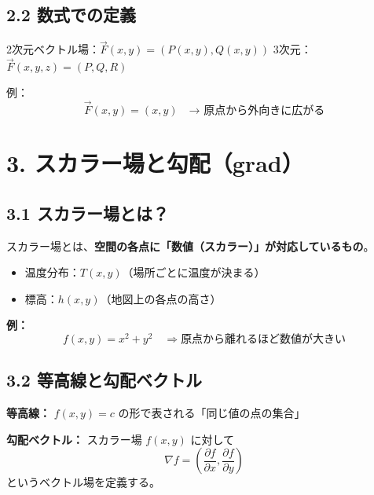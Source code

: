 \documentclass[a4j,11pt]{jsarticle}
\begin{document}
\begin{center}
\end{center}

\subsection*{2.2 数式での定義}
2次元ベクトル場：$\vec{F}(x, y) = (P(x, y), Q(x, y))$  
3次元：$\vec{F}(x, y, z) = (P, Q, R)$

\vspace{3mm}
例：
\[
\vec{F}(x, y) = (x, y) \quad \text{→ 原点から外向きに広がる}
\]

\section*{3. スカラー場と勾配（grad）}

\subsection*{3.1 スカラー場とは？}
スカラー場とは、\textbf{空間の各点に「数値（スカラー）」が対応しているもの}。

\begin{itemize}
  \item 温度分布：$T(x, y)$（場所ごとに温度が決まる）
  \item 標高：$h(x, y)$（地図上の各点の高さ）
\end{itemize}

\textbf{例：}  
\[
f(x, y) = x^2 + y^2 \quad \Rightarrow \text{原点から離れるほど数値が大きい}
\]

\subsection*{3.2 等高線と勾配ベクトル}

\textbf{等高線：} $f(x, y) = c$ の形で表される「同じ値の点の集合」

\textbf{勾配ベクトル：} スカラー場 $f(x, y)$ に対して
\[
\nabla f = \left( \frac{\partial f}{\partial x}, \frac{\partial f}{\partial y} \right)
\]
というベクトル場を定義する。
\end{document}
